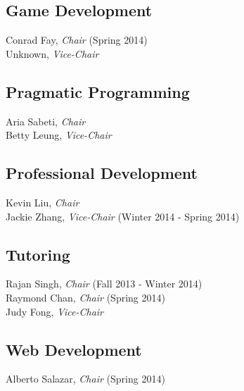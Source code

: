 \documentclass[10pt]{article}
\newcommand{\chair}[1]{#1, \textit{Chair}}
\newcommand{\vicechair}[1]{#1, \textit{Vice-Chair}}
\begin{document}
\subsection{Game Development}

\chair{Conrad Fay} (Spring 2014)\\
\vicechair{Unknown}

\subsection{Pragmatic Programming}

\chair{Aria Sabeti}\\
\vicechair{Betty Leung}

\subsection{Professional Development}

\chair{Kevin Liu}\\
\vicechair{Jackie Zhang} (Winter 2014 - Spring 2014)

\subsection{Tutoring}

\chair{Rajan Singh} (Fall 2013 - Winter 2014)\\
\chair{Raymond Chan} (Spring 2014)\\
\vicechair{Judy Fong}

\subsection{Web Development}

\chair{Alberto Salazar} (Spring 2014)
\end{document}
